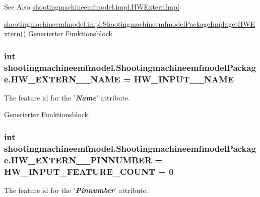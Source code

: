 \begin{DoxySeeAlso}{See Also}
\hyperlink{classshootingmachineemfmodel_1_1impl_1_1_h_w_extern_impl}{shootingmachineemfmodel.\-impl.\-H\-W\-Extern\-Impl} 

\hyperlink{classshootingmachineemfmodel_1_1impl_1_1_shootingmachineemfmodel_package_impl_aebd19ddfbfa5a16616e11c33e7d89eff}{shootingmachineemfmodel.\-impl.\-Shootingmachineemfmodel\-Package\-Impl\-::get\-H\-W\-Extern()} Generierter Funktionsblock 
\end{DoxySeeAlso}
\hypertarget{interfaceshootingmachineemfmodel_1_1_shootingmachineemfmodel_package_ac5a4093023cc1e99970cb1c2e25e6fd1}{
\subsubsection[{H\-W\-\_\-\-E\-X\-T\-E\-R\-N\-\_\-\-\_\-\-N\-A\-M\-E}]{\setlength{\rightskip}{0pt plus 5cm}int shootingmachineemfmodel.\-Shootingmachineemfmodel\-Package.\-H\-W\-\_\-\-E\-X\-T\-E\-R\-N\-\_\-\-\_\-\-N\-A\-M\-E = {\bf H\-W\-\_\-\-I\-N\-P\-U\-T\-\_\-\-\_\-\-N\-A\-M\-E}}}\label{interfaceshootingmachineemfmodel_1_1_shootingmachineemfmodel_package_ac5a4093023cc1e99970cb1c2e25e6fd1}
The feature id for the '{\itshape {\bfseries Name}}' attribute.

Generierter Funktionsblock  \hypertarget{interfaceshootingmachineemfmodel_1_1_shootingmachineemfmodel_package_a9246025f6024796c44d54f6b4ac9533f}{
\subsubsection[{H\-W\-\_\-\-E\-X\-T\-E\-R\-N\-\_\-\-\_\-\-P\-I\-N\-N\-U\-M\-B\-E\-R}]{\setlength{\rightskip}{0pt plus 5cm}int shootingmachineemfmodel.\-Shootingmachineemfmodel\-Package.\-H\-W\-\_\-\-E\-X\-T\-E\-R\-N\-\_\-\-\_\-\-P\-I\-N\-N\-U\-M\-B\-E\-R = {\bf H\-W\-\_\-\-I\-N\-P\-U\-T\-\_\-\-F\-E\-A\-T\-U\-R\-E\-\_\-\-C\-O\-U\-N\-T} + 0}}\label{interfaceshootingmachineemfmodel_1_1_shootingmachineemfmodel_package_a9246025f6024796c44d54f6b4ac9533f}
The feature id for the '{\itshape {\bfseries Pinnumber}}' attribute.

